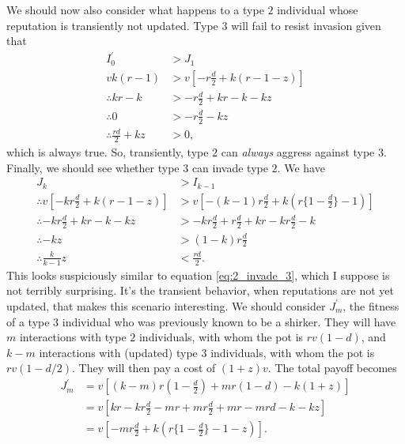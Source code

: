 \documentclass[14pt, a4paper, justified]{article}
\begin{document}
We should now also consider what happens to a type $2$ individual whose reputation is transiently not updated.
Type $3$ will fail to resist invasion given that
\begin{equation}
    \begin{split}
        I^\prime_0 & > J_1 \\
        vk(r-1) & > v[-r\frac{d}{2} + k(r-1-z)] \\
        \therefore kr - k & > -r\frac{d}{2} + kr - k - kz \\
        \therefore 0 & > -r\frac{d}{2} - kz \\
        \therefore \frac{rd}{2} + kz & > 0 ,
    \end{split}
\end{equation}
which is always true.
So, transiently, type $2$ can \emph{always} aggress against type $3$.
Finally, we should see whether type $3$ can invade type $2$.
We have
\begin{equation}
    \begin{split}
        J_k & > I_{k-1} \\
        \therefore v[- kr\frac{d}{2} + k(r - 1 - z)] & > v[-(k-1)r\frac{d}{2} + k(r\{1 - \frac{d}{2}\} - 1)]
        \\
        \therefore -kr\frac{d}{2} + kr - k - kz & > -kr\frac{d}{2} + r\frac{d}{2} + kr - kr\frac{d}{2} - k \\
        \therefore - kz & > (1-k)r\frac{d}{2} \\
        \therefore \frac{k}{k-1}z & < \frac{rd}{2}.
    \end{split}
\end{equation}
This looks suspiciously similar to equation \ref{eq:2_invade_3}, which I suppose is not terribly surprising.
It's the transient behavior, when reputations are not yet updated, that makes this scenario interesting.
We should consider $J^\prime_m$, the fitness of a type $3$ individual who was previously known to be a shirker.
They will have $m$ interactions with type $2$ individuals, with whom the pot is $rv(1-d)$, and $k-m$ interactions with (updated) type $3$ individuals, with whom the pot is $rv(1-d/2)$.
They will then pay a cost of $(1+z)v$.
The total payoff becomes
\begin{equation}
    \begin{split}
        J^\prime_m & = v[(k-m)r(1 - \frac{d}{2}) + mr(1-d) - k(1+z)] \\
        & = v[kr - kr\frac{d}{2} - mr + mr\frac{d}{2} + mr - mrd - k - kz] \\
        & = v[-mr\frac{d}{2} + k(r\{1-\frac{d}{2}\} - 1 - z)].
    \end{split}
\end{equation}
\end{document}
